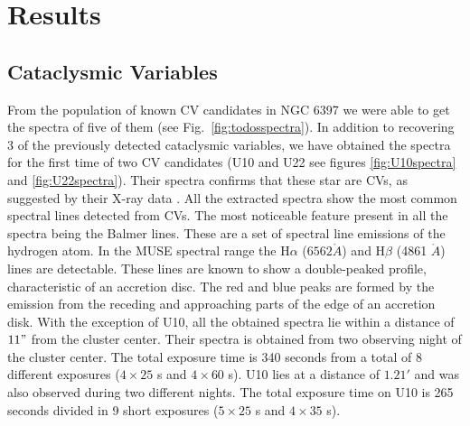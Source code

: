 \chapter{Results}\label{chap:results}
\thispagestyle{fancy}

\section{Cataclysmic Variables }
From the population of known CV candidates in NGC 6397 we were able to get the spectra of five of them (see Fig.~\ref{fig:todosspectra}). In addition to recovering 3 of the previously detected cataclysmic variables, we have obtained the spectra for the first time of two CV candidates (U10 and U22 see figures \ref{fig:U10spectra} and \ref{fig:U22spectra}). Their spectra confirms that these star are CVs, as suggested by their X-ray data \citep{grindlay_chandra_2001}. All the extracted spectra show the most common spectral lines detected from CVs. The most noticeable feature present in all the spectra being the Balmer lines. These are a set of spectral line emissions of the hydrogen atom. In the MUSE spectral range the H$\alpha$ ($6562 \mathring{A}$) and H$\beta$ (4861 $\mathring{A}$) lines are detectable. These lines are known to show a double-peaked profile, characteristic of an accretion disc. The red and blue peaks are formed by the emission from the receding and approaching parts of the edge of an accretion disk. With the exception of U10, all the obtained spectra lie within a distance of $11"$ from the cluster center. Their spectra is obtained from two observing night of the cluster center. The total exposure time is 340 seconds from a total of 8 different exposures ($4 \times 25$ s and $4 \times 60$ s). U10 lies at a distance of $1.21'$ and was also observed during two different nights. The total exposure time on U10 is 265 seconds divided in 9 short exposures ($5 \times 25$ s and $4 \times 35$ s). 


